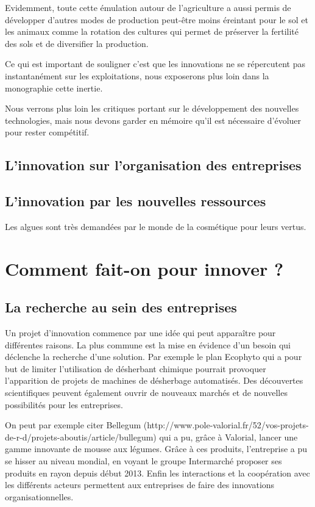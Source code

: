 \documentclass[a4paper,10pt]{report}
\begin{document}
			Evidemment, toute cette émulation autour de l’agriculture a aussi permis de développer d’autres modes de production peut-être moins éreintant pour le sol et les animaux comme la rotation des cultures qui permet de préserver la fertilité des sols et de diversifier la production.
			
			
			Ce qui est important de souligner c’est que les innovations ne se répercutent pas instantanément sur les exploitations, nous exposerons plus loin dans la monographie cette inertie.
			
			Nous verrons plus loin les critiques portant sur le développement des nouvelles technologies, mais nous devons garder en mémoire qu’il est nécessaire d’évoluer pour rester compétitif.
			
			
		\subsection{L'innovation sur l'organisation des entreprises}
				
		\subsection{L'innovation par les nouvelles ressources}
			Les algues sont très demandées par le monde de la cosmétique pour leurs vertus. 
			
	\section{Comment fait-on pour innover ?}
			
		\subsection{La recherche au sein des entreprises}
			Un projet d’innovation commence par une idée qui peut apparaître pour différentes raisons. La plus commune est la mise en évidence d’un besoin qui déclenche la recherche d’une solution. Par exemple le plan Ecophyto qui a pour but de limiter l’utilisation de désherbant chimique pourrait provoquer l’apparition de projets de machines de désherbage automatisés. 
			Des découvertes scientifiques peuvent également ouvrir de nouveaux marchés et de nouvelles possibilités pour les entreprises. 
			
			On peut par exemple citer Bellegum (http://www.pole-valorial.fr/52/vos-projets-de-r-d/projets-aboutis/article/bullegum) qui a pu, grâce à Valorial, lancer une gamme innovante de mousse aux légumes. Grâce à ces produits, l’entreprise a pu se hisser au niveau mondial, en voyant le groupe Intermarché proposer ses produits en rayon depuis début 2013.
			Enfin les interactions et la coopération avec les différents acteurs permettent aux entreprises de faire des innovations organisationnelles.
			
\end{document}
